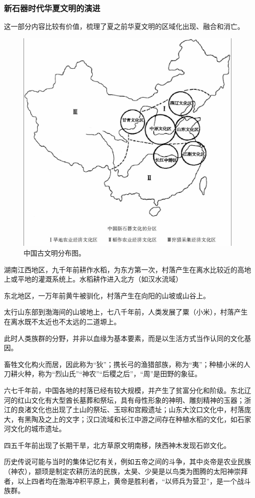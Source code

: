 \subsubsection{新石器时代华夏文明的演进}
这一部分内容比较有价值，梳理了夏之前华夏文明的区域化出现、融合和消亡。
\begin{figure}[htpb]
\centering
\includegraphics[width=0.8\linewidth]{images/china-ancient.png}
\caption{中国古文明分布图。}
\end{figure}

\begin{enumerate*}
	\item 湖南江西地区，九千年前耕作水稻，为东方第一次，村落产生在离水比较近的高地上或平地的灌溉系统上。水稻耕作进入北方（如汉水流域）
	\item 东北地区，一万年前黄牛被驯化，村落产生在向阳的山坡或山谷上。
	\item 太行山东部到渤海间的山坡地上，七八千年前，人类发展了粟（小米），村落产生在离水既不太近也不太远的二道塬上。
	\item 此时人类族群的分野，并非以血缘为基本要素，而是以生活方式当作认同的文化基因。
	\item 畜牲文化构火而居，因此称为“狄”；携长弓的渔猎部族，称为“夷”；种植小米的人刀耕火种，称为“烈山氏”“神农”“后稷之后”，“周”是田野的象征。
	\item 六七千年前，中国各地的村落已经有较大规模，并产生了贫富分化和阶级。东北辽河的红山文化有大型酋长墓葬和祭坛，具有母性形象的神明、雕刻精神的玉器；浙江的良渚文化也出现了土山的祭坛、玉琮和宫殿遗址；山东大汶口文化中，村落庞大，有黑陶及之上的文字；汉口流域和长江中游之间存在种植水稻的文化，如石家河文化的城市遗址。
	\item 四五千年前出现了长期干旱，北方草原文明南移，陕西神木发现石峁文化。
	\item 历史传说可能与当时的集体记忆有关，例如五帝之间的斗争，其中炎帝是农业民族（神农），颛顼是制定农耕历法的民族，太昊、少昊是以鸟类为图腾的太阳神崇拜者，以上四者均在渤海冲积平原上，黄帝是胜利者，“以师兵为营卫”，是一个战斗族群。
\end{enumerate*}

